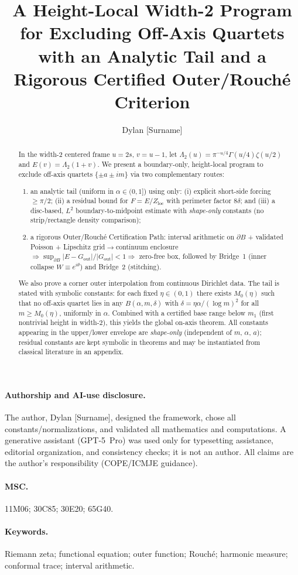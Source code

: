 \documentclass[11pt]{article}
\title{\Large A Height-Local Width-2 Program for Excluding Off-Axis Quartets\\[2pt]
\large with an Analytic Tail and a Rigorous Certified Outer/Rouch\'e Criterion}
\author{Dylan [Surname]}
\date{} %
\numberwithin{equation}{section}
\theoremstyle{remark}
\newcommand{\LamTwo}{\Lambda_2}
\newcommand{\Gout}{G_{\mathrm{out}}}
\newcommand{\Zloc}{Z_{\mathrm{loc}}}
\begin{document}
\maketitle

\paragraph{Authorship and AI-use disclosure.}
The author, Dylan [Surname], designed the framework, chose all constants/normalizations, and validated all mathematics and computations. A generative assistant (GPT-5~Pro) was used only for typesetting assistance, editorial organization, and consistency checks; it is not an author. All claims are the author's responsibility (COPE/ICMJE guidance).

\paragraph{MSC.} 11M06; 30C85; 30E20; 65G40.
\paragraph{Keywords.} Riemann zeta; functional equation; outer function; Rouch\'e; harmonic measure; conformal trace; interval arithmetic.

\begin{abstract}
In the width-2 centered frame $u=2s$, $v=u-1$, let $\LamTwo(u)=\pi^{-u/4}\Gamma(u/4)\zeta(u/2)$ and $E(v)=\LamTwo(1+v)$. We present a boundary-only, height-local program to exclude off-axis quartets $\{\pm a\pm i m\}$ via two complementary routes:
\begin{enumerate}[(1)]
\item an analytic tail (uniform in $\alpha\in(0,1]$) using only: (i) explicit short-side forcing $\ge \pi/2$; (ii) a residual bound for $F=E/\Zloc$ with perimeter factor $8\delta$; and (iii) a disc-based, $L^2$ boundary-to-midpoint estimate with \emph{shape-only} constants (no strip/rectangle density comparison);
\item a rigorous Outer/Rouch\'e Certification Path: interval arithmetic on $\partial B$ + validated Poisson + Lipschitz grid$\to$continuum enclosure $\Rightarrow \sup_{\partial B}\!\big|E-\Gout\big|/|\Gout|<1 \Rightarrow$ zero-free box, followed by Bridge~1 (inner collapse $W\equiv e^{i\theta}$) and Bridge~2 (stitching).
\end{enumerate}
We also prove a corner outer interpolation from continuous Dirichlet data. The tail is stated with symbolic constants: for each fixed $\eta\in(0,1)$ there exists $M_0(\eta)$ such that no off-axis quartet lies in any $B(\alpha,m,\delta)$ with $\delta=\eta\alpha/(\log m)^2$ for all $m\ge M_0(\eta)$, uniformly in $\alpha$. Combined with a certified base range below $m_1$ (first nontrivial height in width-2), this yields the global on-axis theorem. All constants appearing in the upper/lower envelope are \emph{shape-only} (independent of $m$, $\alpha$, $a$); residual constants are kept symbolic in theorems and may be instantiated from classical literature in an appendix.
\end{abstract}
\end{document}
